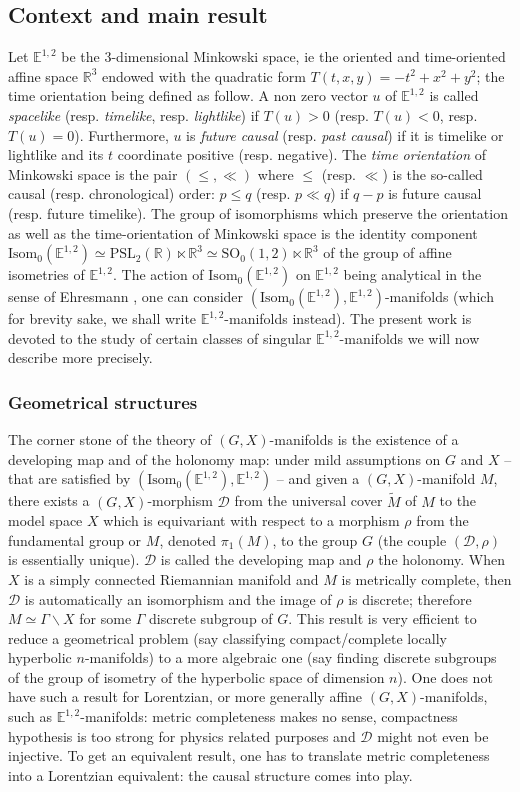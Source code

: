 \documentclass[a4paper,12pt]{article}
\def\D{\mathcal{D}}
\def\isom{Isom}
\def\D{\mathcal{D}}
\def\SO{\mathrm{SO}}
\def\RR{\mathbb{R}}
\newcommand{\mass}[1]{{\mathbb E}^{1,2}_{#1}}
\def\isom{\mathrm{Isom}}
\begin{document}
\subsection{Context and main result}
Let $\mass{}$ be the 3-dimensional Minkowski space, ie the oriented and time-oriented affine space $\RR^3$ endowed with  the quadratic form $T(t,x,y)=-t^2+x^2+y^2$; 
the time orientation being defined as follow. A non zero vector  $u$ of $\mass{}$ is called {\it spacelike} (resp. {\it timelike}, resp. {\it lightlike}) if $T(u)>0$ (resp. $T(u)<0$, resp. $T(u)=0$).
Furthermore, $u$ is {\it future 
causal} (resp. {\it past causal}) if it is timelike or lightlike and its $t$ coordinate positive (resp. negative).
The {\it time orientation} of Minkowski space is the pair $(\leq,\ll)$ 
where $\leq$ (resp. $\ll$) is the so-called  causal (resp. chronological) order: $p \leq q $ (resp. $p \ll q$) if $q-p$ is future causal (resp. future  timelike). 
The group of isomorphisms which preserve the orientation as well as the time-orientation of Minkowski space is the identity component $\isom_0(\mass{})\simeq \mathrm{PSL}_2(\RR)\ltimes \RR^3\simeq \SO_0(1,2)\ltimes \RR^3$ of the  group of affine isometries of $\mass{}$. 
The action of $\isom_0(\mass{})$ on $\mass{}$ being analytical in the sense of Ehresmann \cite{MR794193_loc_hom,MR957518}, one can consider $(\isom_0(\mass{}),\mass{})$-manifolds (which for brevity sake, we shall  write $\mass{}$-manifolds instead). The present work is devoted to the study of certain classes of singular $\mass{}$-manifolds  we will now describe more precisely.

\subsubsection*{Geometrical structures}
The corner stone of the theory of $(G,X)$-manifolds is the existence of a developing map and of the holonomy map: under mild assumptions on $G$ and $X$ -- that are satisfied by  $(\isom_0(\mass{}),\mass{})$ -- and given a $(G,X)$-manifold $M$,
 there exists a $(G,X)$-morphism $\D$ from the universal cover $\widetilde{M}$ of $M$ to the model space 
 $X$ which is equivariant with respect to a morphism $\rho$ from the fundamental group or $M$, denoted $\pi_1(M)$, 
 to the group $G$ (the couple $(\D,\rho)$ is essentially unique). $\D$ is called the developing 
 map and $\rho$ the holonomy. When $X$ is a simply connected Riemannian manifold and $M$ is metrically complete, 
 then  $\D$ is automatically an isomorphism and the image of $\rho$ is discrete; therefore $M \simeq \Gamma\backslash X$ for some $\Gamma$ discrete subgroup of $G$.
This result is very efficient to reduce a geometrical problem (say classifying compact/complete locally hyperbolic $n$-manifolds) to a more algebraic one (say finding discrete subgroups of the group of isometry of the hyperbolic space of dimension $n$). One does not have such a result for Lorentzian, or more generally affine $(G,X)$-manifolds, such as $\mass{}$-manifolds: metric completeness makes no sense, compactness hypothesis is too strong for physics related purposes and $\D$ might not even be injective. To get an equivalent result, one has to translate metric completeness into a Lorentzian equivalent: the causal structure  comes into play. 
\end{document}
